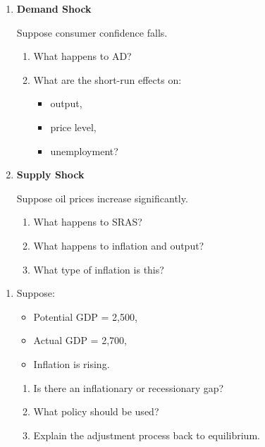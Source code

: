 \documentclass[12pt]{article}
\begin{document}
\begin{enumerate}[label=\textbf{\arabic*.}, start=15]

\item \textbf{Demand Shock}

Suppose consumer confidence falls.

\begin{enumerate}
    \item[(a)] What happens to AD?
    \item[(b)] What are the short-run effects on:
    \begin{itemize}
        \item output,
        \item price level,
        \item unemployment?
    \end{itemize}
\end{enumerate}
\newpage
\item \textbf{Supply Shock}

Suppose oil prices increase significantly.

\begin{enumerate}
    \item[(a)] What happens to SRAS?
    \item[(b)] What happens to inflation and output?
    \item[(c)] What type of inflation is this?
\end{enumerate}

\end{enumerate}



\begin{enumerate}[label=\textbf{\arabic*.}, start=17]

\item Suppose:
\begin{itemize}
    \item Potential GDP = 2,500,
    \item Actual GDP = 2,700,
    \item Inflation is rising.
\end{itemize}

\begin{enumerate}
    \item[(a)] Is there an inflationary or recessionary gap?
    \item[(b)] What policy should be used?
    \item[(c)] Explain the adjustment process back to equilibrium.
\end{enumerate}

\end{enumerate}
\end{document}
